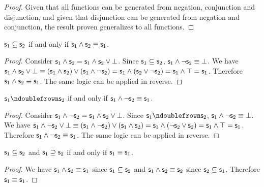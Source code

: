 \documentclass[11pt,letterpaper,fleqn]{memoir} %
\begin{document}
\begin{mathSection}
\begin{proof}
		Given that all functions can be generated from negation, conjunction and disjunction, and given that disjunction can be generated from negation and conjunction, the result proven generalizes to all functions.
	\end{proof}
	
	\begin{prop}
		$\mathsf{s}_1 \subseteq \mathsf{s}_2$ if and only if $\mathsf{s}_1 \wedge \mathsf{s}_2 \equiv \mathsf{s}_1$.
	\end{prop}
	
	\begin{proof}
		Consider $\mathsf{s}_1 \wedge \mathsf{s}_2 = \mathsf{s}_1 \wedge \mathsf{s}_2 \vee \bot$. Since $\mathsf{s}_1 \subseteq \mathsf{s}_2$, $\mathsf{s}_1 \wedge \neg \mathsf{s}_2 \equiv \bot$. We have $\mathsf{s}_1 \wedge \mathsf{s}_2 \vee \bot \equiv ( \mathsf{s}_1 \wedge \mathsf{s}_2 ) \vee (\mathsf{s}_1 \wedge \neg \mathsf{s}_2) = \mathsf{s}_1 \wedge (\mathsf{s}_2 \vee \neg \mathsf{s}_2) = \mathsf{s}_1 \wedge \top = \mathsf{s}_1$. Therefore $\mathsf{s}_1 \wedge \mathsf{s}_2 \equiv \mathsf{s}_1$. The same logic can be applied in reverse.
	\end{proof}	
	
	\begin{prop}
		$\stmt_1 \ncomp \stmt_2$ if and only if $\mathsf{s}_1 \wedge \neg \mathsf{s}_2 \equiv \mathsf{s}_1$.
	\end{prop}
	
	\begin{proof}
		Consider $\mathsf{s}_1 \wedge \neg \mathsf{s}_2 = \mathsf{s}_1 \wedge \mathsf{s}_2 \vee \bot$. Since $\stmt_1 \ncomp \stmt_2$, $\mathsf{s}_1 \wedge \neg \mathsf{s}_2 \equiv \bot$. We have $\mathsf{s}_1 \wedge \neg \mathsf{s}_2 \vee \bot \equiv ( \mathsf{s}_1 \wedge \neg \mathsf{s}_2 ) \vee (\mathsf{s}_1 \wedge \mathsf{s}_2) = \mathsf{s}_1 \wedge (\neg \mathsf{s}_2 \vee \mathsf{s}_2) = \mathsf{s}_1 \wedge \top = \mathsf{s}_1$. Therefore $\mathsf{s}_1 \wedge \neg \mathsf{s}_2 \equiv \mathsf{s}_1$. The same logic can be applied in reverse.
	\end{proof}	
	
	\begin{prop}
		$\mathsf{s}_1 \subseteq \mathsf{s}_2$ and $\mathsf{s}_1 \supseteq \mathsf{s}_2$ if and only if $\mathsf{s}_1 \equiv \mathsf{s}_1$.
	\end{prop}
	
	\begin{proof}
		We have $\mathsf{s}_1 \wedge \mathsf{s}_2 \equiv \mathsf{s}_1$ since $\mathsf{s}_1 \subseteq \mathsf{s}_2$ and $\mathsf{s}_1 \wedge \mathsf{s}_2 \equiv \mathsf{s}_2$ since $\mathsf{s}_2 \subseteq \mathsf{s}_1$. Therefore $\mathsf{s}_1 \equiv \mathsf{s}_1$.
	\end{proof}	
\end{mathSection}
\end{document}
